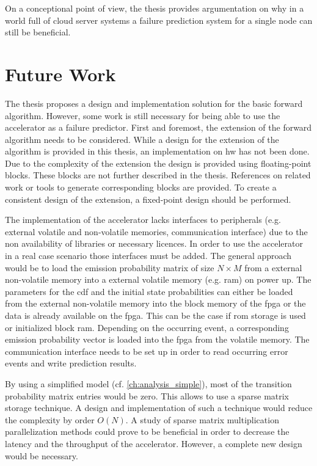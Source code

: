 \documentclass[mscthesis]{usiinfthesis}
\begin{document}
On a conceptional point of view, the thesis provides argumentation on why in
a world full of cloud server systems a failure prediction system for a single
node can still be beneficial.

\section{Future Work}
\label{ch:conc_work}

The thesis proposes a design and implementation solution for the basic forward
algorithm. However, some work is still necessary for being able to use the
accelerator as a failure predictor. First and foremost, the extension of the
forward algorithm needs to be considered. While a design for the extension of
the algorithm is provided in this thesis, an implementation on \gls{hw} has not
been done. Due to the complexity of the extension the design is provided using
floating-point blocks. These blocks are not further described in the thesis.
References on related work or tools to generate corresponding blocks are
provided. To create a consistent design of the extension, a fixed-point design
should be performed.

The implementation of the accelerator lacks interfaces to peripherals (e.g.
external volatile and non-volatile memories, communication interface) due to
the non availability of libraries or necessary licences. In order to use the
accelerator in a real case scenario those interfaces must be added. The general
approach would be to load the emission probability matrix of size $N \times M$
from a external non-volatile memory into a external volatile memory (e.g.
\gls{ram}) on power up. The parameters for the \gls{cdf} and the initial state
probabilities can either be loaded from the external non-volatile memory into
the block memory of the \gls{fpga} or the data is already available on the
\gls{fpga}. This can be the case if \gls{rom} storage is used or initialized
block \gls{ram}.  Depending on the occurring event, a corresponding emission
probability vector is loaded into the \gls{fpga} from the volatile memory. The
communication interface needs to be set up in order to read occurring error
events and write prediction results.

By using a simplified model (cf. \ref{ch:analysis_simple}), most of the
transition probability matrix entries would be zero. This allows to use
a sparse matrix storage technique. A design and implementation of such
a technique would reduce the complexity by order $O(N)$. A study of sparse
matrix multiplication parallelization methods could prove to be beneficial in
order to decrease the latency and the throughput of the accelerator. However,
a complete new design would be necessary.
\end{document}
